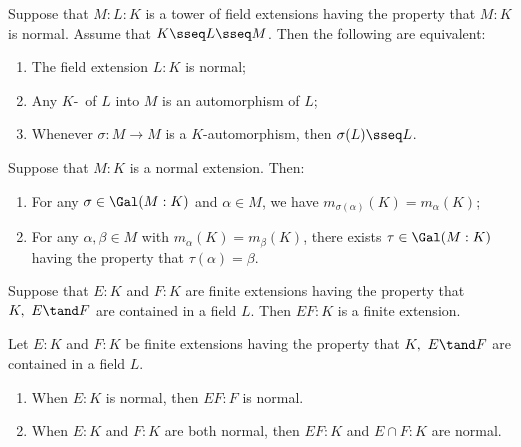 \documentclass{article}
\begin{document}
  \begin{theorem}
    Suppose that $M:L:K$ is a tower of field extensions having the property that $M:K$ is normal. Assume that $K\sseq L\sseq M$. Then the following are equivalent:
    \begin{enumerate}[label=(\roman*)]
      \item The field extension $L:K$ is normal;
      \item Any $K$-\homo~of $L$ into $M$ is an automorphism of $L$;
      \item Whenever $\sigma:M\to M$ is a $K$-automorphism, then $\sigma(L)\sseq L$.
    \end{enumerate}
  \end{theorem}

  \begin{proposition}
    Suppose that $M:K$ is a normal extension. Then:
    \begin{enumerate}[label=(\alph*)]
      \item For any $\sigma\in\Gal(M:K)$ and $\alpha\in M$, we have $m_{\sigma(\alpha)}(K)=m_\alpha(K)$;
      \item For any $\alpha,\beta\in M$ with $m_\alpha(K)=m_\beta(K)$, there exists $\tau\in\Gal(M:K)$ having the property that $\tau(\alpha)=\beta$.
    \end{enumerate}
  \end{proposition}

  \begin{proposition}
    Suppose that $E:K$ and $F:K$ are finite extensions having the property that $K,\ E\tand F$ are contained in a field $L$. Then $EF:K$ is a finite extension.
  \end{proposition}

  \begin{theorem}
    Let $E:K$ and $F:K$ be finite extensions having the property that $K,\ E\tand F$ are contained in a field $L$.
    \begin{enumerate}[label=(\alph*)]
      \item When $E:K$ is normal, then $EF:F$ is normal.
      \item When $E:K$ and $F:K$ are both normal, then $EF:K$ and $E\cap F:K$ are normal.
    \end{enumerate}
  \end{theorem}
\end{document}
